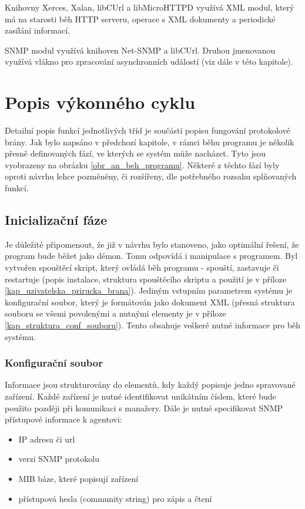 Knihovny Xerces, Xalan, libCUrl a libMicroHTTPD využívá XML modul, který má na starosti běh HTTP serveru, operace s XML dokumenty a periodické zasílání
informací.

SNMP modul využívá knihoven Net-SNMP a libCUrl. Druhou jmenovanou využívá vlákno pro zpracování asynchronních událostí (viz dále v této kapitole).


\section{Popis výkonného cyklu}
Detailní popis funkcí jednotlivých tříd je součástí popisu fungování protokolové brány. Jak bylo napsáno v předchozí kapitole,
v rámci běhu programu je několik přesně definovaných fází, ve kterých se systém může nacházet. Tyto jsou vyobrazeny na obrázku \ref{obr_an_beh_programu}.
Některé z těchto fází byly oproti návrhu lehce pozměněny, či rozšířeny, dle potřebného rozsahu splňovaných funkcí.

\subsection{Inicializační fáze}
Je důležité připomenout, že již v návrhu bylo stanoveno, jako optimální řešení, že program bude běžet jako démon. Tomu odpovídá
i manipulace s programem. Byl vytvořen spouštěcí skript, který ovládá běh programu - spouští, zastavuje či restartuje (popis instalace,
struktura spouštěcího skriptu a použití je v příloze \ref{kap_uzivatelska_prirucka_brana}).
Jediným vstupním parametrem systému je konfigurační soubor, který je formátován jako dokument XML (přesná struktura souboru se všemi 
povolenými a nutnými elementy je v příloze \ref{kap_struktura_conf_souboru}). Tento obsahuje veškeré nutné informace pro běh systému.

\subsubsection*{Konfigurační soubor}
Informace jsou strukturovány do elementů, kdy každý popisuje jedno spravované zařízení. Každé zařízení je nutné identifikovat
unikátním číslem, které bude použito později při komunikaci s manažery. Dále je nutné specifikovat SNMP přístupové informace
k agentovi:
\begin{itemize}
	\item IP adresu či url
	\item verzi SNMP protokolu
	\item MIB báze, které popisují zařízení
	\item přístupová hesla (community string) pro zápis a čtení
\end{itemize}

